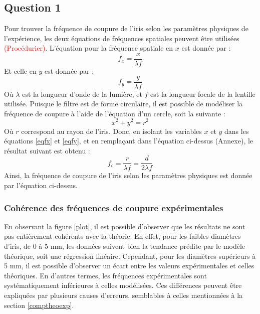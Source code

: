 \documentclass[11pt,letterpaper]{article}
\begin{document}
\subsection{Question 1}\label{q1}

Pour trouver la fréquence de coupure de l'iris selon les paramètres physiques de l'expérience, les deux équations de fréquences spatiales peuvent être utilisées \textcolor{red}{(Procédurier)}. L'équation pour la fréquence spatiale en $x$ est donnée par :
\begin{equation}
  f_{x}=\frac{x}{\lambda f}
  \label{eqfx}
\end{equation}
Et celle en $y$ est donnée par :
\begin{equation}
  f_{y}=\frac{y}{\lambda f}
  \label{eqfy}
\end{equation}
Où $\lambda$ est la longueur d'onde de la lumière, et $f$ est la longueur focale de la lentille utilisée. Puisque le filtre est de forme circulaire, il est possible de modéliser la fréquence de coupure à l'aide de l'équation d'un cercle, soit la suivante :
\begin{equation}
  x^{2}+y^{2}=r^{2}
  \label{eqcercle}
\end{equation}
Où $r$ correspond au rayon de l'iris. Donc, en isolant les variables $x$ et $y$ dans les équations \ref{eqfx} et \ref{eqfy}, et en remplaçant dans l'équation ci-dessus (Annexe), le résultat suivant est obtenu :
\begin{equation}
  f_{c}=\frac{r}{\lambda f}=\frac{d}{2\lambda f}
  \label{eqfc}
\end{equation}
Ainsi, la fréquence de coupure de l'iris selon les paramètres physiques est donnée par l'équation ci-dessus.

\subsubsection{Cohérence des fréquences de coupure expérimentales}
En observant la figure \ref{plot}, il est possible d'observer que les résultats ne sont pas entièrement cohérents avec la théorie. En effet, pour les faibles diamètres d'iris, de 0 à 5 mm, les données suivent bien la tendance prédite par le modèle théorique, soit une régression linéaire. Cependant, pour les diamètres supérieurs à 5 mm, il est possible d'observer un écart entre les valeurs expérimentales et celles théoriques. En d'autres termes, les fréquences expérimentales sont systématiquement inférieures à celles modélisées. Ces différences peuvent être expliquées par plusieurs causes d'erreurs, semblables à celles mentionnées à la section \ref{comptheoexp}.
\end{document}
